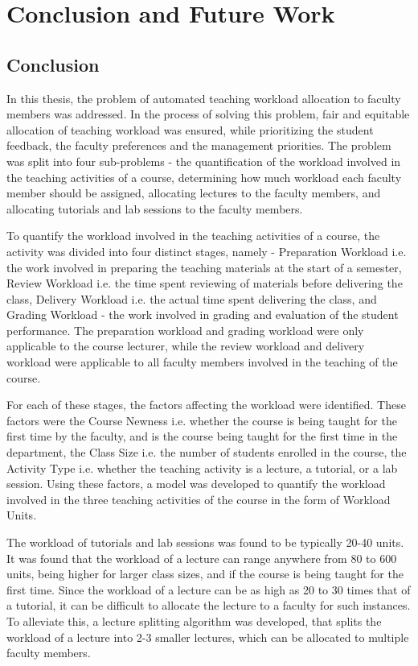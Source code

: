 \chapter{Conclusion and Future Work}

\section{Conclusion}

In this thesis, the problem of automated teaching workload allocation to faculty members was addressed. In the process of solving this problem, fair and equitable allocation of teaching workload was ensured, while prioritizing the student feedback, the faculty preferences and the management priorities. The problem was split into four sub-problems - the quantification of the workload involved in the teaching activities of a course, determining how much workload each faculty member should be assigned, allocating lectures to the faculty members, and allocating tutorials and lab sessions to the faculty members.

To quantify the workload involved in the teaching activities of a course, the activity was divided into four distinct stages, namely - Preparation Workload i.e. the work involved in preparing the teaching materials at the start of a semester, Review Workload i.e. the time spent reviewing of materials before delivering the class, Delivery Workload i.e. the actual time spent delivering the class, and Grading Workload - the work involved in grading and evaluation of the student performance. The preparation workload and grading workload were only applicable to the course lecturer, while the review workload and delivery workload were applicable to all faculty members involved in the teaching of the course.

For each of these stages, the factors affecting the workload were identified. These factors were the Course Newness i.e. whether the course is being taught for the first time by the faculty, and is the course being taught for the first time in the department, the Class Size i.e. the number of students enrolled in the course, the Activity Type i.e. whether the teaching activity is a lecture, a tutorial, or a lab session. Using these factors, a model was developed to quantify the workload involved in the three teaching activities of the course in the form of Workload Units.

The workload of tutorials and lab sessions was found to be typically 20-40 units. It was found that the workload of a lecture can range anywhere from 80 to 600 units, being higher for larger class sizes, and if the course is being taught for the first time. Since the workload of a lecture can be as high as 20 to 30 times that of a tutorial, it can be difficult to allocate the lecture to a faculty for such instances. To alleviate this, a lecture splitting algorithm was developed, that splits the workload of a lecture into 2-3 smaller lectures, which can be allocated to multiple faculty members.


